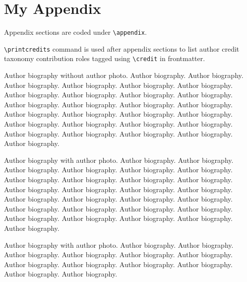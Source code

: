 \documentclass[a4paper,fleqn]{cas-sc}
\begin{document}
				\appendix
				\section{My Appendix}
				Appendix sections are coded under \verb+\appendix+.
				
				\verb+\printcredits+ command is used after appendix sections to list 
				author credit taxonomy contribution roles tagged using \verb+\credit+ 
				in frontmatter.
				
				\printcredits
				
				
				
				
				
				
				
				\bio{}
				Author biography without author photo.
				Author biography. Author biography. Author biography.
				Author biography. Author biography. Author biography.
				Author biography. Author biography. Author biography.
				Author biography. Author biography. Author biography.
				Author biography. Author biography. Author biography.
				Author biography. Author biography. Author biography.
				Author biography. Author biography. Author biography.
				Author biography. Author biography. Author biography.
				Author biography. Author biography. Author biography.
				\endbio
				
				Author biography with author photo.
				Author biography. Author biography. Author biography.
				Author biography. Author biography. Author biography.
				Author biography. Author biography. Author biography.
				Author biography. Author biography. Author biography.
				Author biography. Author biography. Author biography.
				Author biography. Author biography. Author biography.
				Author biography. Author biography. Author biography.
				Author biography. Author biography. Author biography.
				Author biography. Author biography. Author biography.
				\endbio
				
				Author biography with author photo.
				Author biography. Author biography. Author biography.
				Author biography. Author biography. Author biography.
				Author biography. Author biography. Author biography.
				Author biography. Author biography. Author biography.
				\endbio
				
				
			
\end{document}
